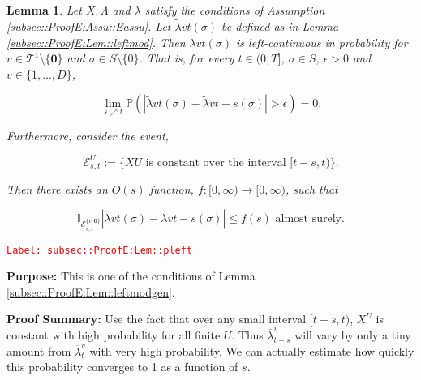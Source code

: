 \documentclass[12pt]{article}
\newcommand{\mb}{\mathbb}
\newcommand{\mc}{\mathcal}
\newcommand{\ra}{\rightarrow}
\newcommand{\ov}{\overline}
\newcommand{\te}{\text}
\newcommand{\ep}{\epsilon}
\newcommand{\tr}{\textcolor{red}}
\newcommand{\labe}[1]{\tr{\texttt{Label: #1}}}
\newcommand{\purpose}{\textbf{Purpose: }}
\newcommand{\pfsum}{\textbf{Proof Summary: }}
\newcommand{\pr}{\mb{P}}							%
\renewcommand{\root}{\mathbf{0}}				%
\renewcommand{\v}{v}							%
\renewcommand{\U}{U}							%
\renewcommand{\S}{S}							%
\newcommand{\s}{\sigma}							%
\newcommand{\T}{T}								%
\renewcommand{\t}{t}							%
\renewcommand{\tt}{s}							%
\newcommand{\X}{X}								%
\newcommand{\degr}{D}							%
\newcommand{\tree}{\mc{T}}						%
\newcommand{\sln}[1]{^{#1}}						%
\newcommand{\rate}{\lambda}						%
\newcommand{\alt}[1]{\widetilde{#1}}			%
\newcommand{\evnt}{\mc{E}}						%
\newcommand{\ratee}{\Lambda}					%
\newcommand{\crate}{\alt{\lambda}}				%
\newtheorem{lem}[thms]{Lemma}
\begin{document}
\begin{lem}
Let \(\X{}{},\ratee{}{}\) and \(\rate{}\) satisfy the conditions of Assumption \ref{subsec::ProofE:Assu::Eassu}. Let \(\crate{\v}{\t}(\s)\) be defined as in Lemma \ref{subsec::ProofE:Lem::leftmod}. Then \(\crate{\v}{\t}(\s)\) is left-continuous in probability for \(\v \in \tree\sln{1}\setminus\{\root\}\) and \(\s \in \S\setminus\{0\}\). That is, for every \(\t \in (0,\T]\), \(\s \in \S\), \(\ep > 0\) and \(\v\in \{1,\dots,\degr\}\),

\[\lim_{\tt \nearrow \t}\pr\left(|\crate{\v}{\t}(\s)- \crate{\v}{\t-\tt}(\s)| > \ep\right) = 0.\]

Furthermore, consider the event,

\[\evnt^\U_{\tt,\t} := \{\X{\U}{} \te{ is constant over the interval } [\t-\tt,\t)\}.\]

Then there exists an \(O(s)\) function, \(f:[0,\infty)\ra[0,\infty)\), such that 

\[\mb{I}_{\evnt^{\{\v,\root\}}_{\tt,\t}}|\crate{\v}{\t}(\s) - \crate{\v}{\t-\tt}(\s)| \leq f(s) \te{ almost surely.}\]
\label{subsec::ProofE:Lem::pleft}
\end{lem}
\labe{subsec::ProofE:Lem::pleft}

\purpose This is one of the conditions of Lemma \ref{subsec::ProofE:Lem::leftmodgen}.

\pfsum Use the fact that over any small interval \([t-s,t)\), \(X^U\) is constant with high probability for all finite \(U\). Thus \(\ov{\lambda}^v_{t-s}\) will vary by only a tiny amount from \(\ov{\lambda}^v_t\) with very high probability. We can actually estimate how quickly this probability converges to 1 as a function of \(s\).
\end{document}
